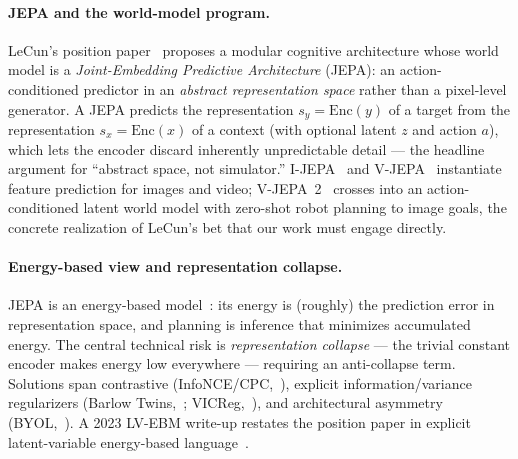 \documentclass{article}
\begin{document}
\paragraph{JEPA and the world-model program.}
LeCun's position paper~\citep{lecun2022path} proposes a modular cognitive
architecture whose world model is a \emph{Joint-Embedding Predictive
Architecture} (JEPA): an action-conditioned predictor in an \emph{abstract
representation space} rather than a pixel-level generator. A JEPA predicts the
representation $s_y=\mathrm{Enc}(y)$ of a target from the representation
$s_x=\mathrm{Enc}(x)$ of a context (with optional latent $z$ and action $a$),
which lets the encoder discard inherently unpredictable detail --- the headline
argument for ``abstract space, not simulator.'' I-JEPA~\citep{assran2023ijepa}
and V-JEPA~\citep{bardes2024vjepa} instantiate feature prediction for images and
video; V-JEPA~2~\citep{fair2025vjepa2} crosses into an action-conditioned latent
world model with zero-shot robot planning to image goals, the concrete
realization of LeCun's bet that our work must engage directly.

\paragraph{Energy-based view and representation collapse.}
JEPA is an energy-based model~\citep{lecun2006ebm}: its energy is (roughly) the
prediction error in representation space, and planning is inference that
minimizes accumulated energy. The central technical risk is \emph{representation
collapse} --- the trivial constant encoder makes energy low everywhere ---
requiring an anti-collapse term. Solutions span contrastive
(InfoNCE/CPC,~\citealp{oord2018cpc}), explicit information/variance regularizers
(Barlow Twins,~\citealp{zbontar2021barlow}; VICReg,~\citealp{bardes2022vicreg}),
and architectural asymmetry (BYOL,~\citealp{grill2020byol}). A 2023 LV-EBM
write-up restates the position paper in explicit latent-variable energy-based
language~\citep{dawid2023lvebm}.
\end{document}
